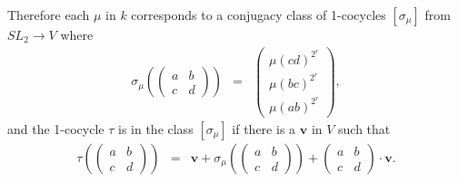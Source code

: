 Therefore each $\mu$ in $k$ corresponds to a conjugacy class of 1-cocycles $[\sigma_\mu]$ from $SL_2\rightarrow V$ where
\begin{eqnarray*}
\sigma_\mu\left(\left(\begin{matrix}a & b \\ c & d \end{matrix}\right)\right) &=&
\left(\begin{matrix}  \mu(cd)^{2^r} \\ \mu(bc)^{2^r} \\ \mu(ab)^{2^r} \end{matrix}\right),
\end{eqnarray*}
and the 1-cocycle $\tau$ is in the class $[\sigma_\mu]$ if there is a $\mathbf{v}$ in $V$ such that
\begin{eqnarray*}
\tau\left(\left(\begin{matrix}a & b \\ c & d \end{matrix}\right)\right) &=&
\mathbf{v} + \sigma_\mu\left(\left(\begin{matrix}a & b \\ c & d \end{matrix}\right)\right)
+ \left(\begin{matrix}a & b \\ c & d \end{matrix}\right)\cdot\mathbf{v}.
\end{eqnarray*}

